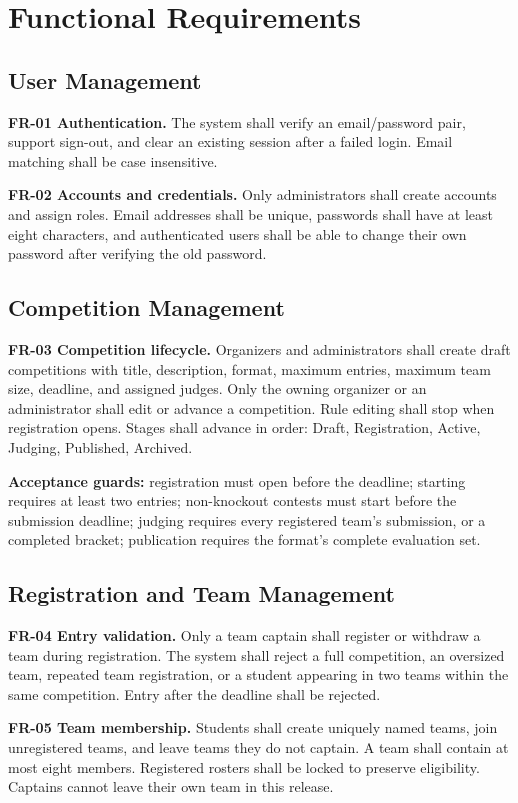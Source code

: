 \section{Functional Requirements}
\subsection{User Management}
\textbf{FR-01 Authentication.} The system shall verify an email/password pair, support sign-out, and clear an existing session after a failed login. Email matching shall be case insensitive.\par
\textbf{FR-02 Accounts and credentials.} Only administrators shall create accounts and assign roles. Email addresses shall be unique, passwords shall have at least eight characters, and authenticated users shall be able to change their own password after verifying the old password.
\subsection{Competition Management}
\textbf{FR-03 Competition lifecycle.} Organizers and administrators shall create draft competitions with title, description, format, maximum entries, maximum team size, deadline, and assigned judges. Only the owning organizer or an administrator shall edit or advance a competition. Rule editing shall stop when registration opens. Stages shall advance in order: Draft, Registration, Active, Judging, Published, Archived.

\textbf{Acceptance guards:} registration must open before the deadline; starting requires at least two entries; non-knockout contests must start before the submission deadline; judging requires every registered team's submission, or a completed bracket; publication requires the format's complete evaluation set.
\subsection{Registration and Team Management}
\textbf{FR-04 Entry validation.} Only a team captain shall register or withdraw a team during registration. The system shall reject a full competition, an oversized team, repeated team registration, or a student appearing in two teams within the same competition. Entry after the deadline shall be rejected.\par
\textbf{FR-05 Team membership.} Students shall create uniquely named teams, join unregistered teams, and leave teams they do not captain. A team shall contain at most eight members. Registered rosters shall be locked to preserve eligibility. Captains cannot leave their own team in this release.
